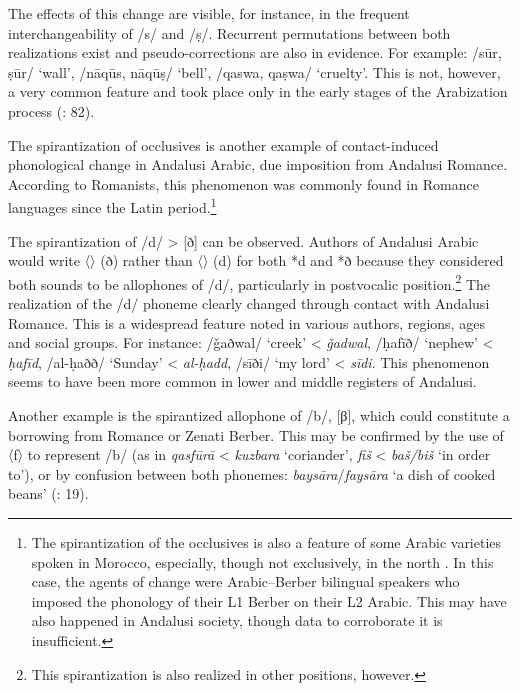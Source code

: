 \documentclass[output=paper,modfonts,nonflat]{langsci/langscibook}
\begin{document}
The effects of this change are visible, for instance, in the frequent interchangeability of /s/ and /ṣ/. Recurrent permutations between both realizations exist and pseudo-corrections are also in evidence. For example: /sūr, ṣūr/ ‘wall’, /nāqūs, nāqūṣ/ ‘bell’, /qaswa, qaṣwa/ ‘cruelty’. This is not, however, a very common feature and took place only in the early stages of the Arabization process (\citealt{CorrientePereiraVicente2015}: 82). 

The spirantization of occlusives is another example of contact-induced phonological change in Andalusi Arabic, due imposition from Andalusi Romance. According to Romanists, this phenomenon was commonly found in Romance languages since the Latin period.\footnote{The spirantization of the occlusives is also a feature of some Arabic varieties spoken in Morocco, especially, though not exclusively, in the north \citep[235--236]{SánchezVicente2012}. In this case, the agents of change were Arabic--Berber bilingual speakers who imposed the phonology of their L1 Berber on their L2 Arabic. This may have also happened in Andalusi society, though data to corroborate it is insufficient.}

The spirantization of /d/ > [ð] can be observed. Authors of Andalusi Arabic would write 〈{}〉 (ð) rather than 〈{}〉 (d) for both *d and *ð because they considered both sounds to be allophones of /d/, particularly in postvocalic position.\footnote{This spirantization is also realized in other positions, however.}  The realization of the /d/ phoneme clearly changed through contact with Andalusi Romance. This is a widespread feature noted in various authors, regions, ages and social groups. For instance: {} /ǧaðwal/ ‘creek’ < \textit{ǧadwal}, {} /ḥafīð/ ‘nephew’ < \textit{ḥafīd}, {} /al-ḥaðð/ ‘Sunday’ < \textit{al-ḥadd}, {} /sīði/ ‘my lord’ < \textit{sīdi}. This phenomenon seems to have been more common in lower and middle registers of Andalusi. 

Another example is the spirantized allophone of /b/, [β], which could constitute a borrowing from Romance or Zenati Berber. This may be confirmed by the use of 〈f〉 to represent /b/ (as in {}  \textit{qasfūrā} < \textit{kuzbara} ‘coriander’, {}  \textit{fiš} < \textit{baš/biš} ‘in order to’), or by confusion between both phonemes: \textit{baysāra}/\textit{faysāra} ‘a dish of cooked beans’ (\citealt{CorrientePereiraVicente2015}: 19).
 
\end{document}
